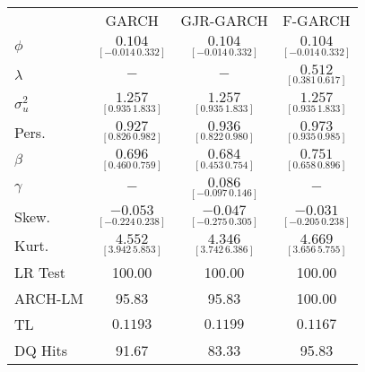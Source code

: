 \begin{tabular}{lccc}
  \toprule
 & GARCH & GJR-GARCH & F-GARCH  \\ 
\cmidrule(lr){2-2} \cmidrule(lr){3-3} \cmidrule(lr){4-4}
 $ \phi$ & $\underset{[-0.014  \, 0.332]}{0.104}$ & $\underset{[-0.014  \, 0.332]}{0.104}$ & $\underset{[-0.014  \, 0.332]}{0.104}$  \\[1em]  
   $\lambda$ & $-$ & $-$ & $\underset{[0.381  \, 0.617]}{0.512}$ \\  [1em]
$\sigma^2_u$ & $\underset{[0.935  \, 1.833]}{1.257}$ & $\underset{[0.935  \, 1.833]}{1.257}$ & $\underset{[0.935  \, 1.833]}{1.257}$ \\[1em] 
   Pers. & $\underset{[0.826  \, 0.982]}{0.927}$ & $\underset{[0.822  \, 0.980]}{0.936}$ & $\underset{[0.935  \, 0.985]}{0.973}$ \\  [1em]
   $\beta$ & $\underset{[0.460  \, 0.759]}{0.696}$ & $\underset{[0.453  \, 0.754]}{0.684}$ & $\underset{[0.658  \, 0.896]}{0.751}$ \\  [1em]
   $\gamma$ & $-$ & $\underset{[-0.097  \, 0.146]}{0.086}$ & $-$ \\  [1em]
  Skew. & $\underset{[-0.224  \, 0.238]}{-0.053}$ & $\underset{[-0.275  \, 0.305]}{-0.047}$ & $\underset{[-0.205  \, 0.238]}{-0.031}$ \\  [1em]
  Kurt. & $\underset{[3.942  \, 5.853]}{4.552}$ & $\underset{[3.742  \, 6.386]}{4.346}$ & $\underset{[3.656  \, 5.755]}{4.669}$ \\  \cmidrule(lr){2-2} \cmidrule(lr){3-3} \cmidrule(lr){4-4}
   LR Test & 100.00 & 100.00 & 100.00 \\  [1em]
  ARCH-LM & 95.83 & 95.83 & 100.00 \\  [1em]
   TL & ${0.1193}$ & ${0.1199}$ & ${0.1167}$ \\  [1em]
   DQ Hits & 91.67 & 83.33 & 95.83 \\ 
   \bottomrule
\end{tabular}
